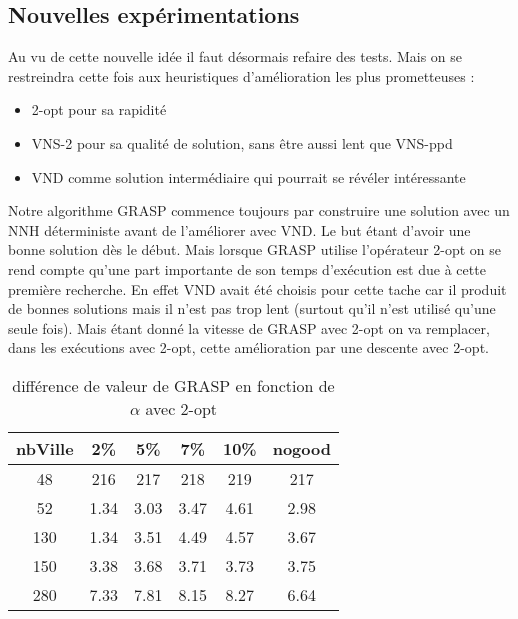 \documentclass[12pt,a4paper]{article}
\begin{document}
\subsection{Nouvelles expérimentations}

Au vu de cette nouvelle idée il faut désormais refaire des tests. Mais on se restreindra cette fois aux heuristiques d'amélioration les plus prometteuses :
\begin{itemize}
\item
2-opt pour sa rapidité
\item
VNS-2 pour sa qualité de solution, sans être aussi lent que VNS-ppd
\item
VND comme solution intermédiaire qui pourrait se révéler intéressante
\end{itemize}

Notre algorithme GRASP commence toujours par construire une solution avec un NNH déterministe avant de l’améliorer avec VND. Le but étant d'avoir une bonne solution dès le début. Mais lorsque GRASP utilise l’opérateur 2-opt on se rend compte qu'une part importante de son temps d’exécution est due à cette première recherche. En effet VND avait été choisis pour cette tache car il produit de bonnes solutions mais il n'est pas trop lent (surtout qu'il n'est utilisé qu'une seule fois). Mais étant donné la vitesse de GRASP avec 2-opt on va remplacer, dans les exécutions avec 2-opt, cette amélioration par une descente avec 2-opt.

\begin{table}[!h]
\centering
\begin{tabular}{|*{6}{c|}}
  \hline
  nbVille & 2\% & 5\% & 7\% & 10\% & nogood \\
  \hline
  48 & 216 & 217 & 218 & 219 & 217 \\
  52 & 1.34 & 3.03 & 3.47 & 4.61 & 2.98 \\
  130 & 1.34 & 3.51 & 4.49 & 4.57 & 3.67 \\
  150 & 3.38 & 3.68 & 3.71 & 3.73 & 3.75 \\
  280 & 7.33 & 7.81 & 8.15 & 8.27 & 6.64 \\
  \hline
\end{tabular}
\caption{différence de valeur de GRASP en fonction de $\alpha$ avec 2-opt}
\label{recherchelocaleGRASPval2optproba}
\end{table}
\end{document}
